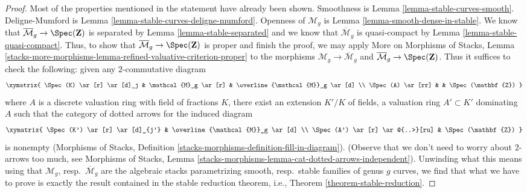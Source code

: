 \begin{proof}
Most of the properties mentioned in the statement have already been shown.
Smoothness is Lemma \ref{lemma-stable-curves-smooth}.
Deligne-Mumford is Lemma \ref{lemma-stable-curves-deligne-mumford}.
Openness of $\mathcal{M}_g$ is Lemma \ref{lemma-smooth-dense-in-stable}.
We know that $\overline{\mathcal{M}}_g \to \Spec(\mathbf{Z})$
is separated by Lemma \ref{lemma-stable-separated} and we know that
$\overline{\mathcal{M}}_g$ is quasi-compact by
Lemma \ref{lemma-stable-quasi-compact}.
Thus, to show that $\overline{\mathcal{M}}_g \to \Spec(\mathbf{Z})$
is proper and finish the proof, we may apply
More on Morphisms of Stacks, Lemma
\ref{stacks-more-morphisms-lemma-refined-valuative-criterion-proper}
to the morphisms $\mathcal{M}_g \to \overline{\mathcal{M}}_g$ and
$\overline{\mathcal{M}}_g \to \Spec(\mathbf{Z})$.
Thus it suffices to check the following: given any $2$-commutative diagram
$$
\xymatrix{
\Spec(K) \ar[r] \ar[d]_j &
\mathcal{M}_g \ar[r] &
\overline{\mathcal{M}}_g \ar[d] \\
\Spec(A) \ar[rr] & & \Spec(\mathbf{Z})
}
$$
where $A$ is a discrete valuation ring with field of fractions $K$, there
exist an extension $K'/K$ of fields, a valuation ring $A' \subset K'$
dominating $A$ such that the category of dotted arrows for the
induced diagram
$$
\xymatrix{
\Spec(K') \ar[r] \ar[d]_{j'} & \overline{\mathcal{M}}_g \ar[d] \\
\Spec(A') \ar[r] \ar@{..>}[ru] & \Spec(\mathbf{Z})
}
$$
is nonempty (Morphisms of Stacks, Definition
\ref{stacks-morphisms-definition-fill-in-diagram}).
(Observe that we don't need to worry about
$2$-arrows too much, see Morphisms of Stacks, Lemma
\ref{stacks-morphisms-lemma-cat-dotted-arrows-independent}).
Unwinding what this means using that
$\mathcal{M}_g$, resp.\ $\overline{\mathcal{M}}_g$ are the algebraic
stacks parametrizing smooth, resp.\ stable families of genus $g$ curves,
we find that what we have to prove is exactly the result contained
in the stable reduction theorem, i.e., Theorem
\ref{theorem-stable-reduction}.
\end{proof}

















